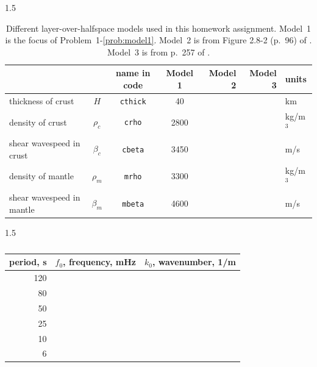 \documentclass[11pt,titlepage,fleqn]{article}
\begin{document}
\clearpage\pagebreak

\begin{table}
\vspace{-3cm}
\centering
\caption[]
{{
Different layer-over-halfspace models used in this homework assignment.
Model~1 is the focus of Problem~1-\ref{prob:model1}.
Model~2 is from  Figure 2.8-2 (p.~96) of \citet{SteinWysession}.
Model~3 is from p.~257 of \citet{AkiRichardsE2}.
\label{tab:models}
}}
\begin{spacing}{1.5}
\begin{tabular}{||l|c|c|c|r|r|l||}
\hline\hline
& & name in code & Model 1 & Model 2 & Model 3 & units \\
\hline\hline
thickness of crust        & $H$       & \verb+cthick+  & 40   & & & km       \\ \hline
density of crust          & $\rho_c$  & \verb+crho+    & 2800 & & & kg/m$^3$ \\ \hline
shear wavespeed in crust  & $\beta_c$ & \verb+cbeta+   & 3450 & & & m/s      \\ \hline
density of mantle         & $\rho_m$  & \verb+mrho+    & 3300 & & & kg/m$^3$ \\ \hline
shear wavespeed in mantle & $\beta_m$ & \verb+mbeta+   & 4600 & & & m/s      \\
\hline\hline
\end{tabular}
\end{spacing}
\end{table}

\begin{table}
\vspace{-5cm}
\centering
\caption[]
{{
\label{tab:k0}
}}
\begin{spacing}{1.5}
\begin{tabular}{r|r|r}
\hline\hline
period, s & $f_0$, frequency, mHz & $k_0$, wavenumber, 1/m  \\ \hline\hline
120 & & \\ \hline
80 & & \\ \hline
50 & &  \\ \hline
25 & & \\ \hline
10 & & \\ \hline
6 & &  \\ \hline
\end{tabular}
\end{spacing}
\end{table}
\end{document}
